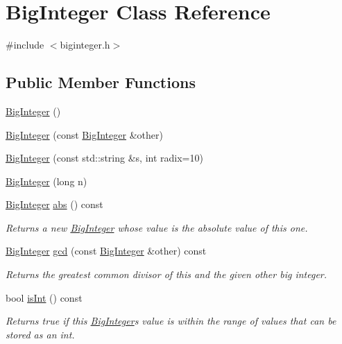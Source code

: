\hypertarget{classBigInteger}{}\section{Big\+Integer Class Reference}
\label{classBigInteger}


{\ttfamily \#include $<$biginteger.\+h$>$}

\subsection*{Public Member Functions}
\begin{DoxyCompactItemize}
\item 
\mbox{\hyperlink{classBigInteger_a49b951f4a6687820741740806aa04715}{Big\+Integer}} ()
\item 
\mbox{\hyperlink{classBigInteger_a2b2f122dc8513adcbf68d8b329834c9a}{Big\+Integer}} (const \mbox{\hyperlink{classBigInteger}{Big\+Integer}} \&other)
\item 
\mbox{\hyperlink{classBigInteger_aa54e846a6f657634a4554b9540b339e4}{Big\+Integer}} (const std\+::string \&s, int radix=10)
\item 
\mbox{\hyperlink{classBigInteger_a647b32454d89f386f4e8d3137d4e5526}{Big\+Integer}} (long n)
\item 
\mbox{\hyperlink{classBigInteger}{Big\+Integer}} \mbox{\hyperlink{classBigInteger_aa60f0a3be5766293b78752ac6d7430fe}{abs}} () const
\begin{DoxyCompactList}\small\item\em Returns a new \mbox{\hyperlink{classBigInteger}{Big\+Integer}} whose value is the absolute value of this one. \end{DoxyCompactList}\item 
\mbox{\hyperlink{classBigInteger}{Big\+Integer}} \mbox{\hyperlink{classBigInteger_a7863ef61a27a110c2971b0011ebd74b9}{gcd}} (const \mbox{\hyperlink{classBigInteger}{Big\+Integer}} \&other) const
\begin{DoxyCompactList}\small\item\em Returns the greatest common divisor of this and the given other big integer. \end{DoxyCompactList}\item 
bool \mbox{\hyperlink{classBigInteger_a772efbf9d46b2e1e3840763a76307040}{is\+Int}} () const
\begin{DoxyCompactList}\small\item\em Returns true if this \mbox{\hyperlink{classBigInteger}{Big\+Integer}}\textquotesingle{}s value is within the range of values that can be stored as an int. \end{DoxyCompactList}\item 

\end{DoxyCompactItemize}
